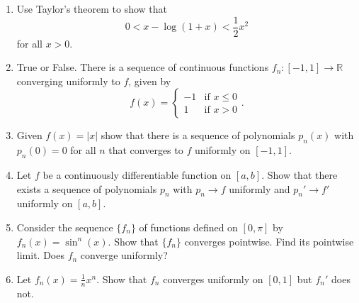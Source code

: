 \documentclass[11pt,letterpaper]{report}
\newcommand{\reals}{\mathbb{R}}
\begin{document}
\begin{enumerate}
	\item Use Taylor's theorem to show that
	\[
	0<x-\log(1+x)<\frac{1}{2}x^2
	\]
	for all $x>0$.
	\vfill
	\item True or False. There is a sequence of continuous functions $f_n:[-1, 1]\to \reals$ converging uniformly to $f$, given by
	\[
	f(x) = \begin{cases}
		-1&\text{if }x\leq 0\\
		1&\text{if }x>0
	\end{cases}.
	\]
	\vfill
	\item Given $f(x) = |x|$ show that there is a sequence of polynomials $p_n(x)$ with $p_n(0) = 0$ for all $n$ that converges to $f$ uniformly on $[-1,1]$.
	\vfill
	\item Let $f$ be a continuously differentiable function on $[a,b]$. Show that there exists a sequence of polynomials $p_n$ with $p_n\to f$ uniformly and $p_n'\to f'$ uniformly on $[a,b]$.
	\vfill
	\item Consider the sequence $\{f_n\}$ of functions defined on $[0,\pi]$ by $f_n(x) = \sin^n(x)$. Show that $\{f_n\}$ converges pointwise. Find its pointwise limit. Does $f_n$ converge uniformly?
	\vfill\null\pagebreak

	\item Let $f_n(x) = \frac{1}{n}x^n$. Show that $f_n$ converges uniformly on $[0,1]$ but $f_n'$ does not.
	\vfill
\end{enumerate}
\end{document}
